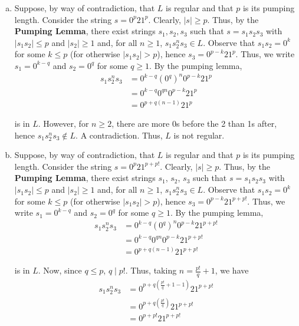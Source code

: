 \begin{solution}\mbox{\\}
\begin{enumerate}[(a)]
    \item Suppose, by way of contradiction, that \(L\) is regular and that \(p\) is its pumping length. Consider the string \(s=0^p21^p\). Clearly, \(|s|\geq p\). Thus, by the \textbf{Pumping Lemma}, there exist strings \(s_1, s_2, s_3\) such that \(s=s_1s_2s_3\) with \(|s_1s_2|\leq p\) and \(|s_2|\geq1\) and, for all \(n\geq 1\), \(s_1s_2^n s_3\in L\). Observe that \(s_1s_2=0^k\) for some \(k\leq p\) (for otherwise \(|s_1s_2| > p\)), hence \(s_3=0^{p-k}21^p\). Thus, we write \(s_1=0^{k-q}\) and \(s_2=0^{q}\) for some \(q\geq1\). By the pumping lemma, 
    \begin{align*}
        s_1s_2^n s_3 &= 0^{k-q}{(0^q)}^n0^{p-k}21^p\\
                    &= 0^{k-q}0^{qn}0^{p-k}21^p\\
                    &= 0^{p+q(n-1)}21^p
    \end{align*}

    is in \(L\). However, for \(n\geq2\), there are more 0s before the 2 than 1s after, hence \(s_1s_2^n s_3\not\in L\). A contradiction. Thus, \(L\) is not regular.

    \item Suppose, by way of contradiction, that \(L\) is regular and that \(p\) is its pumping length. Consider the string \(s=0^p21^{p+p!}\). Clearly, \(|s|\geq p\). Thus, by the \textbf{Pumping Lemma}, there exist strings \(s_1\), \(s_2\), \(s_3\) such that \(s=s_1s_2s_3\) with \(|s_1s_2|\leq p\) and \(|s_2|\geq1\) and, for all \(n\geq 1\), \(s_1s_2^n s_3\in L\). Observe that \(s_1s_2=0^k\) for some \(k\leq p\) (for otherwise \(|s_1s_2| > p\)), hence \(s_3=0^{p-k}21^{p+p!}\). Thus, we write \(s_1=0^{k-q}\) and \(s_2=0^{q}\) for some \(q\geq1\). By the pumping lemma, 
    \begin{align*}
        s_1s_2^n s_3 &= 0^{k-q}{(0^q)}^n0^{p-k}21^{p+p!}\\
                    &= 0^{k-q}0^{qn}0^{p-k}21^{p+p!}\\
                    &= 0^{p+q(n-1)}21^{p+p!}
    \end{align*}

    is in \(L\). Now, since \(q\leq p\), \(q\mid p{!}\). Thus, taking \(n=\frac{p!}{q}+1\), we have 
    \begin{align*}
        s_1s_2^n s_3 &= 0^{p+q(\frac{p!}{q}+1-1)}21^{p+p!}\\
                    &= 0^{p+q(\frac{p!}{q})}21^{p+p!}\\
                    &= 0^{p+p!}21^{p+p!}
    \end{align*}
    

\end{enumerate}
\end{solution}
